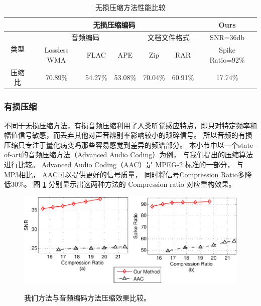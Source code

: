 \begin{table}[ht]%
\caption{无损压缩方法性能比较} %
\label{tab:compression_ratio_comp} \centering
\begin{tabular}{|c||c|c|c|c|c|c|}%
\hline
 & \multicolumn{5}{c|}{无损压缩编码} & Ours\\
  \hline \hline
 \multirow{2}{*}{类型} & \multicolumn{3}{c|}{音频编码} & \multicolumn{2}{c|}{文档文件格式} & SNR=36db\\
 \cline{2-6}
 & Lossless WMA & FLAC & APE & Zip & RAR &Spike Ratio=92\%\\
 \cline{1-7}
 压缩比 & 70.89\% & 54.27\% & 53.08\% & 70.04\% & 60.91\% & 17.74\%\\
\hline
\end{tabular}
\end{table}



\subsubsection{有损压缩}
不同于无损压缩方法，有损音频压缩利用了人类听觉感应特点，即只对特定频率和幅值信号敏感，而丢弃其他对声音辨别率影响较小的琐碎信号。 所以音频的有损压缩只专注于量化病变吗那些容易感觉到差异的频谱部分。 本小节中以一个state-of-art的音频压缩方法（Advanced Audio Coding）为例， 与我们提出的压缩算法进行比较。 Advanced Audio Coding（AAC）是 MPEG-2 标准的一部分， 与MP3相比， AAC可以提供更好的信号质量， 同时将信号Compression Ratio多降低30\%。 图 \ref{fig:Comparison-AAC and Ours} 分别显示出这两种方法的 Compression ratio 对应重构效果。


\begin{figure}
  \centering
  \includegraphics{Pictures/Compression/f13-crop.pdf}\\
  \caption{ 我们方法与音频编码方法压缩效果比较。 }\label{fig:Comparison-AAC and Ours}
\end{figure}



